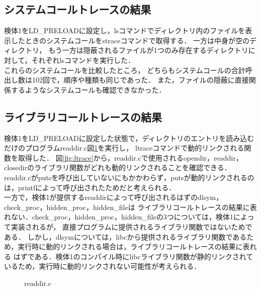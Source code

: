 \documentclass[submit,techreq,noauthor]{eco}	%
\begin{document}
\subsection{システムコールトレースの結果}
検体1をLD\_PRELOADに設定し，lsコマンドでディレクトリ内のファイルを表示したときのシステムコールをstraceコマンドで取得する．
一方は中身が空のディレクトリ，
もう一方は隠蔽されるファイルが1つのみ存在するディレクトリに対して，それぞれlsコマンドを実行した．\\
\indent
これらのシステムコールを比較したところ，
どちらもシステムコールの合計呼出し数は102回で，順序や種類も同じであった．
また，ファイルの隠蔽に直接関係するようなシステムコールも確認できなかった．

\subsection{ライブラリコールトレースの結果}
検体1をLD\_PRELOADに設定した状態で，ディレクトリのエントリを読み込むだけのプログラムreaddir.c\lbrack 図\ref{fig:readdir}\rbrack を実行し，
ltraceコマンドで動的リンクされる関数を取得した．
図\ref{fig:ltrace}から，readdir.cで使用されるopendir，readdir，closedirのライブラリ関数がどれも動的リンクされることを確認できる．
readdir.cがputsを呼び出していないにもかかわらず，putsが動的リンクされるのは，printfによって呼び出されたためだと考えられる．\\
\indent
一方で，検体1が提供するreaddirによって呼び出されるはずのdlsym，check\_proc，hidden\_proc，hidden\_fileは
ライブラリコールトレースの結果に表れない．check\_proc，hidden\_proc，hidden\_fileの3つについては，検体1によって実装されるが，
直接プログラムに提供されるライブラリ関数ではないためである．
しかし，dlsymについては，libcから提供されるライブラリ関数であるため，実行時に動的リンクされる場合は，ライブラリコールトレースの結果に表れる
はずである．検体1のコンパイル時にlibcライブラリ関数が静的リンクされているため，実行時に動的リンクされない可能性が考えられる．

\begin{figure}[H]
	\centering
	\caption{readdir.c}
	\label{fig:readdir}
\end{figure}
\end{document}
